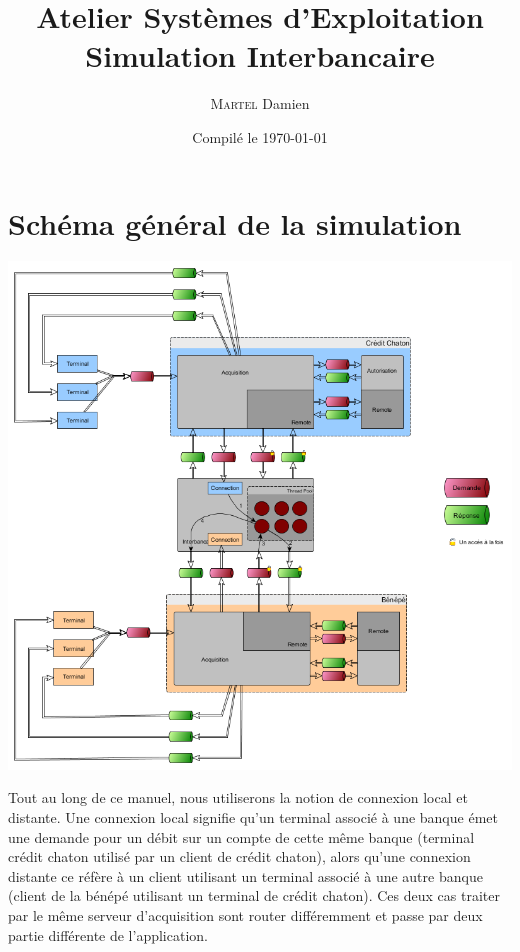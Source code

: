 \documentclass[french, a4paper, 12pt, titlepage]{article}
\begin{document}
\title{Atelier Systèmes d'Exploitation\\Simulation Interbancaire}
\author{\textsc{Martel} Damien}
\date{Compilé le \today}

\maketitle

\vfill
\pagebreak

\newpage
\strut\thispagestyle{empty}
\vfill
\pagebreak
\tableofcontents
\strut\thispagestyle{empty}
\newpage
\setcounter{page}{1}

\section{Schéma général de la simulation}
\medskip
\begin{center}
\includegraphics[scale=0.5]{global}
\end{center}
\medskip

Tout au long de ce manuel, nous utiliserons la notion de connexion local et distante.
Une connexion local signifie qu'un terminal associé à une banque émet une demande pour un débit sur un compte de cette même banque (terminal crédit chaton utilisé par un client de crédit chaton), alors qu'une connexion distante ce réfère à un client utilisant un terminal associé à une autre banque (client de la bénépé utilisant un terminal de crédit chaton).
Ces deux cas traiter par le même serveur d'acquisition sont router différemment et passe par deux partie différente de l'application.
\end{document}
